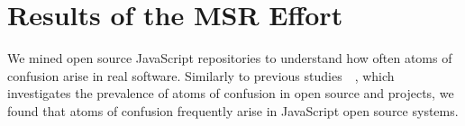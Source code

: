 
\section{Results of the MSR Effort}
\label{sec:msr-results} 

We mined \minedprojects open source JavaScript repositories to understand how often atoms of confusion arise in real software. Similarly to previous studies~\cite{DBLP:conf/msr/GopsteinZFC18}~\cite{DBLP:journals/ese/MedeirosLAAKRG19}, which investigates the prevalence of atoms of confusion in open source \clang and \cpplang projects, we found that atoms of confusion frequently arise in JavaScript open source systems.

